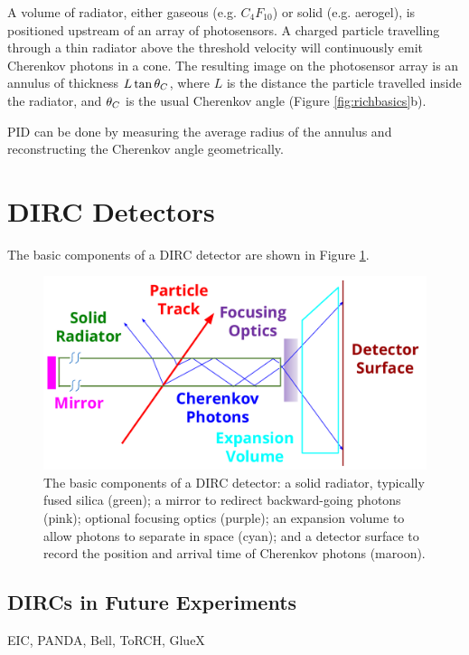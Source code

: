 A volume of radiator, either gaseous (e.g. $C_{4}F_{10}$) or solid (e.g. aerogel), is positioned upstream of an array of photosensors. A charged particle travelling through a thin radiator above the threshold velocity will continuously emit Cherenkov photons in a cone. The resulting image on the photosensor array is an annulus of thickness $L\tan\theta_{C}$, where $L$ is the distance the particle travelled inside the radiator, and  $\theta_{C}$ is the usual Cherenkov angle (Figure \ref{fig:richbasics}b).

PID can be done by measuring the average radius of the annulus and reconstructing the Cherenkov angle geometrically.


\section{DIRC Detectors}
The basic components of a DIRC detector are shown in Figure \ref{fig:dircbasics}.

\begin{figure}[ht]
	\centering
	\includegraphics[scale=0.7]{figures/DIRC_components.pdf}
	\caption{The basic components of a DIRC detector: a solid radiator, typically fused silica (green); a mirror to redirect backward-going photons (pink); optional focusing optics (purple); an expansion volume to allow photons to separate in space (cyan); and a detector surface to record the position and arrival time of Cherenkov photons (maroon).}
	\label{fig:dircbasics}
\end{figure}

\subsection{DIRCs in Future Experiments}
EIC, PANDA, Bell, ToRCH, GlueX
